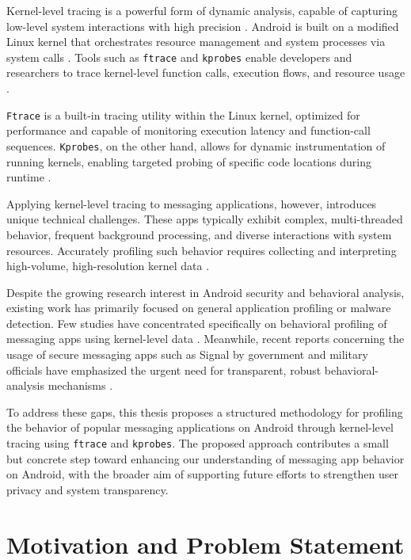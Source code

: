 \documentclass[a4paper,12pt]{report}
\begin{document}
Kernel-level tracing is a powerful form of dynamic analysis, capable of capturing
low-level system interactions with high precision \cite{BPFroid2021}. Android is
built on a modified
Linux kernel that orchestrates resource management and system processes via
system calls \cite{AOSP2024Ftrace}. Tools such as \texttt{ftrace} and
\texttt{kprobes} enable developers and researchers to trace kernel-level function
calls, execution flows, and resource usage \cite{AOSP2024Ftrace,Kprobes2024}.

\texttt{Ftrace} is a built-in tracing utility within the Linux kernel, optimized
for performance and capable of monitoring execution latency and function-call
sequences. \texttt{Kprobes}, on the other hand, allows for dynamic instrumentation
of running kernels, enabling targeted probing of specific code locations during
runtime \cite{Kprobes2024}.

Applying kernel-level tracing to messaging applications, however, introduces
unique technical challenges. These apps typically exhibit complex,
multi-threaded behavior, frequent background processing, and diverse interactions
with system resources. Accurately profiling such behavior requires collecting and
interpreting high-volume, high-resolution kernel data \cite{BPFroid2021}.

Despite the growing research interest in Android security and behavioral
analysis, existing work has primarily focused on general application profiling or
malware detection. Few studies have concentrated specifically on behavioral
profiling of messaging apps using kernel-level data \cite{SLR2025Messaging}.
Meanwhile, recent reports concerning the usage of secure messaging apps such as
Signal by government and military officials have emphasized the urgent need for
transparent, robust behavioral-analysis mechanisms \cite{Politico2025Signal}.

To address these gaps, this thesis proposes a structured methodology for
profiling the behavior of popular messaging applications on Android through
kernel-level tracing using \texttt{ftrace} and \texttt{kprobes}. The proposed
approach contributes a small but concrete step toward enhancing our understanding
of messaging app behavior on Android, with the broader aim of supporting future
efforts to strengthen user privacy and system transparency.

\section{Motivation and Problem Statement}
\end{document}
